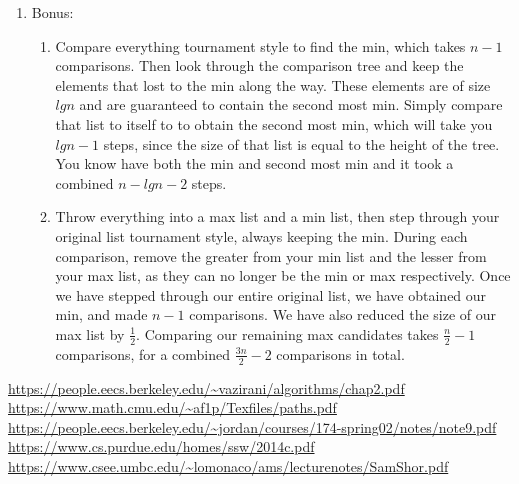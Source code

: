 \documentclass{article}
\begin{document}
\begin{enumerate}
\item Bonus:
    \begin{enumerate}
        \item Compare everything tournament style to find the min, which takes \(n - 1\) comparisons. Then look through the comparison tree and keep the elements that lost to the min along the way. These elements are of size \(lg n\) and are guaranteed to contain the second most min. Simply compare that list to itself to to obtain the second most min, which will take you \(lg n - 1\) steps, since the size of that list is equal to the height of the tree. You know have both the min and second most min and it took a combined \(n - lg n - 2\) steps.
        \item Throw everything into a max list and a min list, then step through your original list tournament style, always keeping the min. During each comparison, remove the greater from your min list and the lesser from your max list, as they can no longer be the min or max respectively. Once we have stepped through our entire original list, we have obtained our min, and made \(n - 1\) comparisons. We have also reduced the size of our max list by \(\frac{1}{2}\). Comparing our remaining max candidates takes \(\frac{n}{2} - 1\) comparisons, for a combined \(\frac{3n}{2} - 2\) comparisons in total.
   \end{enumerate}

\end{enumerate}
\begin{thebibliography}{00}
 \url{https://people.eecs.berkeley.edu/~vazirani/algorithms/chap2.pdf}
 \url{https://www.math.cmu.edu/~af1p/Texfiles/paths.pdf}
 \url{https://people.eecs.berkeley.edu/~jordan/courses/174-spring02/notes/note9.pdf}
\url{https://www.cs.purdue.edu/homes/ssw/2014c.pdf}
\url{https://www.csee.umbc.edu/~lomonaco/ams/lecturenotes/SamShor.pdf}
\end{thebibliography}
\end{document}
